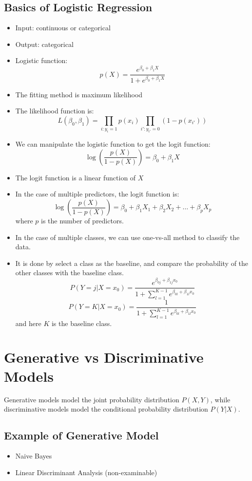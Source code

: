 \documentclass[12pt,a4paper]{article}
\begin{document}
\subsection{Basics of Logistic Regression}
\begin{itemize}
    \item Input: continuous or categorical
    \item Output: categorical
    \item Logistic function:
    $$
    p(X) = \frac{e^{\beta_0 + \beta_1 X}}{1 + e^{\beta_0 + \beta_1 X}}
    $$
    \item The fitting method is maximum likelihood 
    \item The likelihood function is:
    $$
    L(\beta_0, \beta_1) = \prod_{i:y_i=1} p(x_i) \prod_{i':y_{i'}=0} \left(1-p(x_{i'})\right)
    $$
    \item We can manipulate the logistic function to get the logit function:
    $$
    \log \left(\frac{p(X)}{1-p(X)}\right) = \beta_0 + \beta_1 X
    $$
    \item The logit function is a linear function of $X$
    \item In the case of multiple predictors, the logit function is:
    $$
    \log \left(\frac{p(X)}{1-p(X)}\right) = \beta_0 + \beta_1 X_1 + \beta_2 X_2 + \ldots + \beta_p X_p
    $$
    where $p$ is the number of predictors.
    \item In the case of multiple classes, we can use one-vs-all method to classify the data.
    \item It is done by select a class as the baseline, and compare the probability of the other classes with the baseline class.
    $$
    P(Y = j | X = x_0) = \frac{e^{\beta_{0 j} + \beta_{1 j} x_0}}{1 + \sum_{l=1}^{K-1} e^{\beta_{0 l} + \beta_{1 l} x_0}}
    $$
    $$
    P(Y = K | X = x_0) = \frac{1}{1 + \sum_{l=1}^{K-1} e^{\beta_{0 l} + \beta_{1 l} x_0}}
    $$
    and here $K$ is the baseline class.
\end{itemize}

\section{Generative vs Discriminative Models}
Generative models model the joint probability distribution $P(X, Y)$, while discriminative models model the conditional probability distribution $P(Y|X)$.
\subsection{Example of Generative Model}
\begin{itemize}
    \item Naive Bayes
    \item Linear Discriminant Analysis (non-examinable)
\end{itemize}
\end{document}
